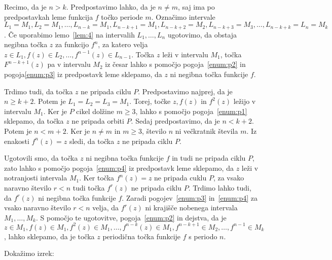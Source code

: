 \documentclass[../TG_magistrsko_delo_sections.tex]{subfiles}
\begin{document}
\begin{dokaz}
Recimo, da je $n>k$. Predpostavimo lahko, da je $n \neq m$, saj ima po predpostavkah leme funkcija $f$ točko periode $m$. Označimo intervale $L_1 = M_1, L_2 = M_1, \dots, L_{n-k} = M_1, L_{n-k+1} = M_1, L_{n-k+2} = M_2,  L_{n-k+3} = M_3, \dots, L_{n-k+k} =L_n =M_k$. Če uporabimo lemo~\ref{lem:4} na intervalih $L_1, \dots, L_n$ ugotovimo, da obstaja negibna točka $z$ za funkcijo $f^n$, za katero velja $z \in L_1, f(z) \in L_2, \dots, f^{n-1}(z) \in L_{n-1}$. Točka $z$ leži v intervalu $M_1$, točka $F^{n-k+1}(z)$ pa v intervalu $M_2$ iz česar lahko s pomočjo pogoja~\ref{enum:p2} in pogoja\ref{enum:p3} iz predpostavk leme sklepamo, da $z$ ni negibna točka funkcije $f$. 

Trdimo tudi, da točka $z$ ne pripada ciklu $P$. Predpostavimo najprej, da je $n \geq k + 2$. Potem je $L_1 =L_2 = L_3 = M_1$. Torej, točke $z, f(z)$ in $f^2(z)$ ležijo v intervalu $M_1$. Ker je $P$ cikel dolžine $m \geq 3$, lahko s pomočjo pogoja~\ref{enum:p1} sklepamo, da točka $z$ ne pripada orbiti $P$. Sedaj predpostavimo, da je $n < k+2$. Potem je $n < m+2$. Ker je $n\neq m$ in $m \geq 3$, število $n$ ni večkratnik števila $m$. Iz enakosti $f^n(z) = z$ sledi, da točka $z$ ne pripada ciklu $P$.

Ugotovili smo, da točka $z$ ni negibna točka funkcije $f$ in tudi ne pripada ciklu $P$, zato lahko s pomočjo pogoja~\ref{enum:p4} iz predpostavk leme sklepamo, da $z$ leži v notranjosti intervala $M_1$. Ker točka $f^n(z) = z$ ne pripada cuklu $P$, za vsako naravno število $r < n$ tudi točka $f^r(z)$ ne pripada ciklu $P$. Trdimo lahko tudi, da $f^r(z)$ ni negibna točka funkcije $f$. Zaradi pogojev~\ref{enum:p3} in~\ref{enum:p4} za vsako naravno število $r < n$ velja, da $f^r(z)$ ni krajišče nobenega intervala $M_1, \dots, M_k$. S pomočjo te ugotovitve, pogoja~\ref{enum:p2} in dejstva, da je $z \in M_1, f(z) \in M_1, f^2(z) \in M_1, \dots, f^{n-k}(z) \in M_1, f^{n-k+1} \in M_2, \dots, f^{n-1} \in M_k$, lahko sklepamo, da je točka $z$ periodična točka funkcije $f$ s periodo $n$.
\end{dokaz}


Dokažimo izrek:
\end{document}
